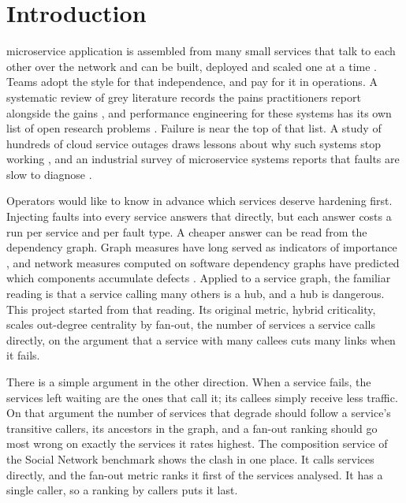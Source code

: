 \section{Introduction}
\label{sec:intro}

 microservice application is assembled from many small services that talk to
each other over the network and can be built, deployed and scaled one at a time
\cite{dragoni2017,jamshidi2018}. Teams adopt the style for that independence, and pay for it
in operations. A systematic review of grey literature records the pains practitioners report
alongside the gains \cite{soldani2018}, and performance engineering for these systems has its
own list of open research problems \cite{heinrich2017}. Failure is near the top of that list.
A study of hundreds of cloud service outages draws lessons about why such systems stop
working \cite{gunawi2016}, and an industrial survey of microservice systems reports that
faults are slow to diagnose \cite{zhou2021}.

Operators would like to know in advance which services deserve hardening first. Injecting
faults into every service answers that directly, but each answer costs a run per service and
per fault type. A cheaper answer can be read from the dependency graph. Graph measures have
long served as indicators of importance \cite{freeman1978}, and network measures computed on
software dependency graphs have predicted which components accumulate defects
\cite{zimmermann2008}. Applied to a service graph, the familiar reading is that a service
calling many others is a hub, and a hub is dangerous. This project started from that reading.
Its original metric, hybrid criticality, scales out-degree centrality by fan-out, the number
of services a service calls directly, on the argument that a service with many callees cuts
many links when it fails.

There is a simple argument in the other direction. When a service fails, the services left
waiting are the ones that call it; its callees simply receive less traffic. On that argument
the number of services that degrade should follow a service's transitive callers, its
ancestors in the graph, and a fan-out ranking should go most wrong on exactly the services it
rates highest. The composition service of the Social Network benchmark shows the clash in one
place. It calls  services directly, and the fan-out metric ranks
it first %
of the  services analysed. It has a single caller,
so a ranking by callers puts it last. %

